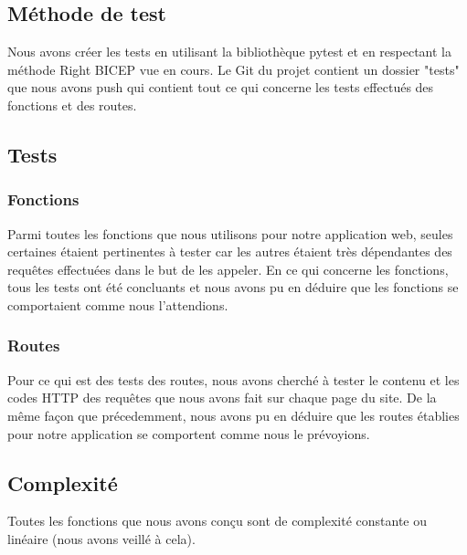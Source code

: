 \vskip 0.60cm
\subsection{Méthode de test}
\vskip 0.25cm
\noindent
Nous avons créer les tests en utilisant la bibliothèque pytest et en respectant la méthode Right BICEP vue en cours. Le Git du projet contient un dossier "tests" que nous avons push qui contient tout ce qui concerne les tests effectués des fonctions et des routes.
\vskip 0.25cm
\subsection{Tests}
\subsubsection{Fonctions}
\vskip 0.25cm
\noindent
Parmi toutes les fonctions que nous utilisons pour notre application web, seules certaines étaient pertinentes à tester car les autres étaient très dépendantes des requêtes effectuées dans le but de les appeler.
\vskip 0.25cm
\noindent
En ce qui concerne les fonctions, tous les tests ont été concluants et nous avons pu en déduire que les fonctions se comportaient comme nous l'attendions.
\vskip 0.25cm
\subsubsection{Routes}
\vskip 0.25cm
\noindent
Pour ce qui est des tests des routes, nous avons cherché à tester le contenu et les codes HTTP des requêtes que nous avons fait sur chaque page du site.
\vskip 0.25cm
\noindent
De la même façon que précedemment, nous avons pu en déduire que les routes établies pour notre application se comportent comme nous le prévoyions.
\vskip 0.25cm
\subsection{Complexité}
\vskip 0.25cm
\noindent
Toutes les fonctions que nous avons conçu sont de complexité constante ou linéaire (nous avons veillé à cela).
\vskip 0.25cm